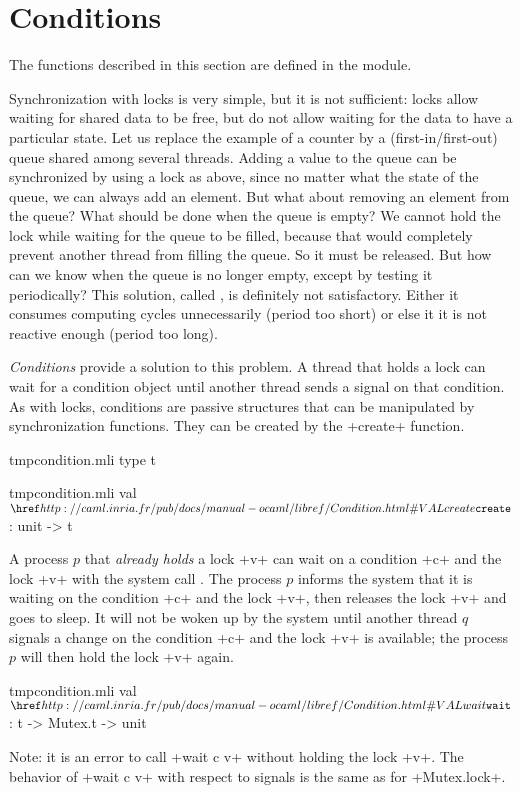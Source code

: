\section{Conditions}

The functions described in this section are defined in the
 module.

Synchronization with locks is very simple, but it is not sufficient:
locks allow waiting for shared data to be free, but do not allow
waiting for the data to have a particular state.  Let us replace the
example of a counter by a (first-in/first-out) queue shared among
several threads.  Adding a value to the queue can be synchronized by
using a lock as above, since no matter what the state of the queue,
we can always add an element.  But what about removing an element
from the queue?  What should be done when the queue is empty?  We
cannot hold the lock while waiting for the queue to be filled, because
that would completely prevent another thread from filling the queue.
So it must be released.  But how can we know when the queue is no
longer empty, except by testing it periodically?  This solution,
called , is definitely not satisfactory.  Either
it consumes computing cycles unnecessarily (period too short) or else
it it is not reactive enough (period too long).

\emph{Conditions} provide a solution to this problem.  A thread that
holds a lock can wait for a condition object until another thread
sends a signal on that condition.  As with locks, conditions are
passive structures that can be manipulated by synchronization
functions.  They can be created by the \ml+create+
function.
%
\begin{codefile}{tmpcondition.mli}
type t
\end{codefile}
%
\begin{listingcodefile}{tmpcondition.mli}
val $\libvalue{Condition}{create}$ : unit -> t
\end{listingcodefile}
%
A process $p$ that \emph{already holds} a lock \ml+v+ can wait on a
condition \ml+c+ and the lock \ml+v+ with the system call .
The process $p$ informs the system that it is waiting on the condition
\ml+c+ and the lock \ml+v+, then releases the lock \ml+v+ and goes to
sleep.  It will not be woken up by the system until another thread $q$
signals a change on the condition \ml+c+ and the lock \ml+v+ is
available; the process $p$ will then hold the lock \ml+v+ again.
%
\begin{listingcodefile}{tmpcondition.mli}
val $\libvalue{Condition}{wait}$ : t -> Mutex.t -> unit
\end{listingcodefile}
%
Note: it is an error to call \ml+wait c v+ without holding the lock
\ml+v+.  The behavior of \ml+wait c v+ with respect to signals is the
same as for \ml+Mutex.lock+.


